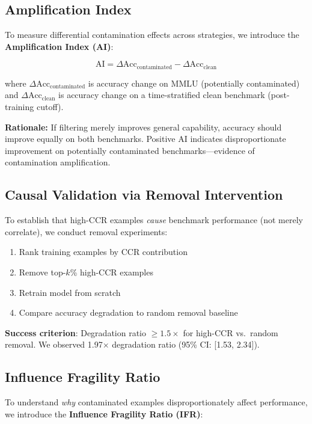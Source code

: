 \subsection{Amplification Index}

To measure differential contamination effects across strategies, we introduce the \textbf{Amplification Index (AI)}:

\begin{equation}
\text{AI} = \Delta\text{Acc}_{\text{contaminated}} - \Delta\text{Acc}_{\text{clean}}
\end{equation}

where $\Delta\text{Acc}_{\text{contaminated}}$ is accuracy change on MMLU (potentially contaminated) and $\Delta\text{Acc}_{\text{clean}}$ is accuracy change on a time-stratified clean benchmark (post-training cutoff).

\textbf{Rationale:} If filtering merely improves general capability, accuracy should improve equally on both benchmarks. Positive AI indicates disproportionate improvement on potentially contaminated benchmarks---evidence of contamination amplification.

\subsection{Causal Validation via Removal Intervention}

To establish that high-CCR examples \textit{cause} benchmark performance (not merely correlate), we conduct removal experiments:

\begin{enumerate}
    \item Rank training examples by CCR contribution
    \item Remove top-$k$\% high-CCR examples
    \item Retrain model from scratch
    \item Compare accuracy degradation to random removal baseline
\end{enumerate}

\textbf{Success criterion}: Degradation ratio $\geq 1.5\times$ for high-CCR vs.\ random removal. We observed 1.97$\times$ degradation ratio (95\% CI: [1.53, 2.34]).

\subsection{Influence Fragility Ratio}

To understand \textit{why} contaminated examples disproportionately affect performance, we introduce the \textbf{Influence Fragility Ratio (IFR)}:

